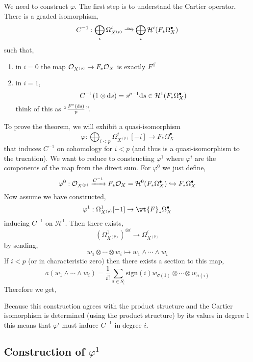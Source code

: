 \documentclass[12pt]{article}
\newcommand{\LL}{\mathbb{L}}
\begin{document}
We need to construct $\varphi$. The first step is to understand the Cartier operator. There is a graded isomorphism,
\[ C^{-1} : \bigoplus_{i} \Omega^i_{X^{(p)}} \iso \bigoplus_i \mathcal{H}^i(F_* \Omega^\bullet_{X}) \]
such that,
\begin{enumerate}
\item in $i = 0$ the map $\mathcal{O}_{X^{(p)}} \to F_* \mathcal{O}_{X}$ is exactly $F^{\#}$
\item in $i = 1$,
\[ C^{-1}(1 \otimes \mathrm{d}{s}) = s^{p-1} \mathrm{d}{s} \in \mathcal{H}^1(F_* \Omega^\bullet_{X}) \]
think of this as ``$\frac{F^*(\mathrm{d}{s})}{p}$''.  
\end{enumerate}
\noindent
To prove the theorem, we will exhibit a quasi-isomorphism
\[ \varphi : \bigoplus_{i < p} \Omega^i_{X^{(p)}}[-i] \to F_* \Omega^\bullet_{X} \]
that induces $C^{-1}$ on cohomology for $i < p$ (and thus is a quasi-isomorphism to the trucation). We want to reduce to constructing $\varphi^1$ where $\varphi^i$ are the components of the map from the direct sum. For $\varphi^0$ we just define,
\[ \varphi^0 : \mathcal{O}_{X^{(p)}} \xrightarrow{C^{-1}} F_* \mathcal{O}_{X} = \mathcal{H}^0(F_* \Omega^\bullet_{X}) \hookrightarrow F_* \Omega^\bullet_{X} \]
Now assume we have constructed,
\[ \varphi^1 : \Omega^1_{X^{(p)}} [-1] \to \wt{F}_* \Omega^\bullet_{X} \]
inducing $C^{-1}$ on $\mathcal{H}^1$.
Then there exists,
\[ \left( \Omega^1_{X^{(p)}} \right)^{\otimes i} \to \Omega^i_{X^{(p)}} \]
by sending,
\[ w_1 \otimes \cdots \otimes w_i \mapsto w_1 \wedge \cdots \wedge w_i \]
If $i < p$ (or in characteristic zero) then there exists a section to this map,
\[ a(w_1 \wedge \cdots \wedge w_i)  = \frac{1}{i!} \sum_{\sigma \in S_i} \mathrm{sign}(i) w_{\sigma(1)} \otimes \cdots \otimes w_{\sigma(i)} \]
Therefore we get,
\begin{center}
\end{center}
Because this construction agrees with the product structure and the Cartier isomorphism is determined (using the product structure) by its values in degree $1$ this means that $\varphi^i$ must induce $C^{-1}$ in degree $i$.


\subsection{Construction of $\varphi^1$}
\end{document}
